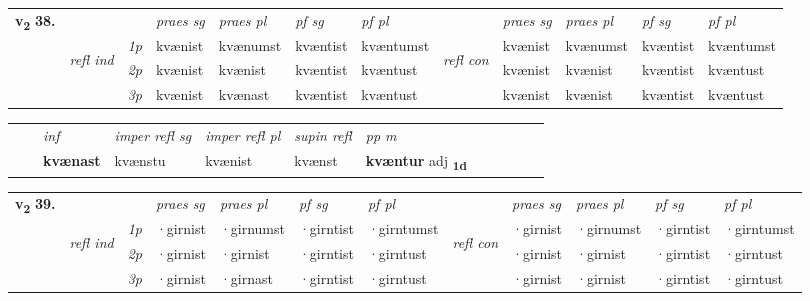 \begin{tabular}{llllllllllll} \toprule
\multirow{4}{*}{{{\textbf{v{\textsubscript{2}}} \Large{\textbf{38.}}}}}  & &   &  \textit{praes sg}  & \textit{praes pl}  &\textit{pf sg} & \textit{pf pl} &  &  \textit{praes sg}  & \textit{praes pl}  & \textit{pf sg} & \textit{pf pl } \\*
	\cmidrule{4-7} \cmidrule{9-12}
 &\multirow{3}{*}{\begin{turn}{90}\textit{refl ind}\end{turn}} & {\textit{1p}} & kvænist & kvænumst    & kvæntist & kvæntumst & \multirow{3}{*}{\begin{turn}{90}\textit{refl con}\end{turn}}  &kvænist & kvænumst & kvæntist & kvæntumst\\*
 &&  {\textit{2p}} &  kvænist  & kvænist   & kvæntist & kvæntust & &kvænist & kvænist & kvæntist & kvæntust \\*
& &  {\textit{3p}} & kvænist & kvænast   & kvæntist & kvæntust & & kvænist & kvænist& kvæntist & kvæntust  \\*
\cmidrule{4-7} \cmidrule{9-12}
\end{tabular}


\begin{tabular}{llllllllllll}
 & & \textit{inf}   & \textit{imper refl sg} & \textit{imper refl pl}   & \textit{supin refl} & \textit{pp m}     \\*
  & & \textbf{kvænast}    & kvænstu & kvænist   & kvænst & \textbf{kvæntur} adj \textbf{\textsubscript{1d}} \\*
\cmidrule{1-12}
\end{tabular}



\begin{tabular}{llllllllllll} \toprule
\multirow{4}{*}{{{\textbf{v{\textsubscript{2}}} \Large{\textbf{39.}}}}}  & &   &  \textit{praes sg}  & \textit{praes pl}  &\textit{pf sg} & \textit{pf pl} &  &  \textit{praes sg}  & \textit{praes pl}  & \textit{pf sg} & \textit{pf pl } \\*
	\cmidrule{4-7} \cmidrule{9-12}
 &\multirow{3}{*}{\begin{turn}{90}\textit{refl ind}\end{turn}} & {\textit{1p}} & ·girnist & ·girnumst    & ·girntist & ·girntumst & \multirow{3}{*}{\begin{turn}{90}\textit{refl con}\end{turn}}  &·girnist & ·girnumst & ·girntist & ·girntumst\\*
 &&  {\textit{2p}} &  ·girnist  & ·girnist   & ·girntist & ·girntust & &·girnist & ·girnist & ·girntist & ·girntust \\*
& &  {\textit{3p}} & ·girnist & ·girnast   & ·girntist & ·girntust & & ·girnist & ·girnist& ·girntist & ·girntust  \\*
\cmidrule{4-7} \cmidrule{9-12}
\end{tabular}


